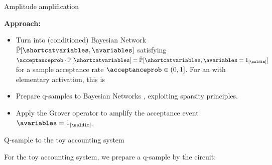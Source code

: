 \documentclass{beamer}
\begin{document}
    \begin{frame}{Amplitude amplification}

    {\bf Approach:}
        \begin{itemize}
            \item Turn \CompActNets{} into (conditioned) Bayesian Network $\secprobat{\shortcatvariables,\avariables}$ satisfying $\acceptanceprob \cdot \probwith
            = \secprobat{\shortcatvariables,\avariables=1_{[\seldim]}}$ for a sample acceptance rate $\acceptanceprob\in(0,1]$.
            For an \CompActNet{} with elementary activation, this is
            \begin{center}
                
            \end{center}
            \item Prepare q-samples to Bayesian Networks \cite{low_quantum_2014}, exploiting sparsity principles.
            \item Apply the Grover operator to amplify the acceptance event $\avariables=\onetuple{[\seldim]}$.
        \end{itemize}


    \end{frame}

    \begin{frame}{Q-sample to the toy accounting system}

        For the toy accounting system, we prepare a q-sample by the circuit:
        \begin{center}
            
        \end{center}

    \end{frame}
\end{document}
